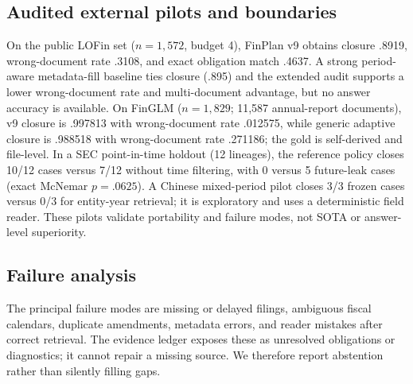 \documentclass[12pt]{article}
\begin{document}
\subsection{Audited external pilots and boundaries}
On the public LOFin set ($n=1,572$, budget 4), FinPlan v9 obtains closure .8919, wrong-document rate .3108, and exact obligation match .4637. A strong period-aware metadata-fill baseline ties closure (.895) and the extended audit supports a lower wrong-document rate and multi-document advantage, but no answer accuracy is available. On FinGLM ($n=1,829$; 11,587 annual-report documents), v9 closure is .997813 with wrong-document rate .012575, while generic adaptive closure is .988518 with wrong-document rate .271186; the gold is self-derived and file-level. In a SEC point-in-time holdout (12 lineages), the reference policy closes 10/12 cases versus 7/12 without time filtering, with 0 versus 5 future-leak cases (exact McNemar $p=.0625$). A Chinese mixed-period pilot closes 3/3 frozen cases versus 0/3 for entity-year retrieval; it is exploratory and uses a deterministic field reader. These pilots validate portability and failure modes, not SOTA or answer-level superiority.

\subsection{Failure analysis}
The principal failure modes are missing or delayed filings, ambiguous fiscal calendars, duplicate amendments, metadata errors, and reader mistakes after correct retrieval. The evidence ledger exposes these as unresolved obligations or diagnostics; it cannot repair a missing source. We therefore report abstention rather than silently filling gaps.
\end{document}
